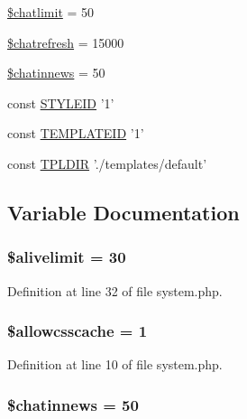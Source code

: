 \begin{DoxyCompactItemize}
\item 
\hyperlink{system_8php_abfdb7140a2f6eb43761a0bd41978c2b6}{\$chatlimit} = 50
\item 
\hyperlink{system_8php_a78f649f720bf10e6c4cdcb6c3748b034}{\$chatrefresh} = 15000
\item 
\hyperlink{system_8php_a85d510cdf8e6d00b6c72c1fb096824e7}{\$chatinnews} = 50
\item 
const \hyperlink{system_8php_a44c99c5ea9011ae4269df6a6f183e0f9}{S\+T\+Y\+L\+E\+I\+D} '1'
\item 
const \hyperlink{system_8php_abb9280feb515c6b25482a31caaf87450}{T\+E\+M\+P\+L\+A\+T\+E\+I\+D} '1'
\item 
const \hyperlink{system_8php_abbbdebc91409601dbe1d4e83187021da}{T\+P\+L\+D\+I\+R} './templates/default'
\end{DoxyCompactItemize}


\subsection{Variable Documentation}
\hypertarget{system_8php_a9579e8fa7e38029b40db1389d73ae37d}{
\subsubsection[{\$alivelimit}]{\setlength{\rightskip}{0pt plus 5cm}\$alivelimit = 30}}\label{system_8php_a9579e8fa7e38029b40db1389d73ae37d}


Definition at line 32 of file system.\+php.

\hypertarget{system_8php_a41cecb05679c39ff5461f76d4707ecbb}{
\subsubsection[{\$allowcsscache}]{\setlength{\rightskip}{0pt plus 5cm}\$allowcsscache = 1}}\label{system_8php_a41cecb05679c39ff5461f76d4707ecbb}


Definition at line 10 of file system.\+php.

\hypertarget{system_8php_a85d510cdf8e6d00b6c72c1fb096824e7}{
\subsubsection[{\$chatinnews}]{\setlength{\rightskip}{0pt plus 5cm}\$chatinnews = 50}}\label{system_8php_a85d510cdf8e6d00b6c72c1fb096824e7}


